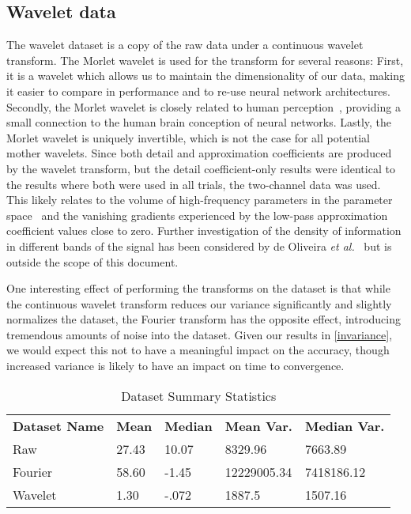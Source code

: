 \subsection{Wavelet data}
The wavelet dataset is a copy of the raw data under a continuous wavelet transform. 
The Morlet wavelet is used for the transform for several reasons:
First, it is a wavelet which allows us to maintain the dimensionality of our data, making it easier to compare in performance and to re-use neural network architectures.
Secondly, the Morlet wavelet is closely related to human perception~\cite{mallat1999wavelet, daugman1985uncertainty}, providing a small connection to the human brain conception of neural networks.
Lastly, the Morlet wavelet is uniquely invertible, which is not the case for all potential mother wavelets. 
Since both detail and approximation coefficients are produced by the wavelet transform, but the detail coefficient-only results were identical to the results where both were used in all trials, the two-channel data was used.
This likely relates to the volume of high-frequency parameters in the parameter space~\cite{rahaman2018spectral} and the vanishing gradients experienced by the low-pass approximation coefficient values close to zero.
Further investigation of the density of information in different bands of the signal has been considered by de Oliveira \textit{et al.}~\cite{de2006wavelet} but is outside the scope of this document.

One interesting effect of performing the transforms on the dataset is that while the continuous wavelet transform reduces our variance significantly and slightly normalizes the dataset, the Fourier transform has the opposite effect, introducing tremendous amounts of noise into the dataset.
Given our results in \ref{invariance}, we would expect this not to have a meaningful impact on the accuracy, though increased variance is likely to have an impact on time to convergence.

\renewcommand{\thefootnote}{*} 
\begin{table}[h]
\caption{Dataset Summary Statistics}
\centering
\label{Tab:summary}	
\begin{tabular}{l|llll}
\textbf{Dataset Name} & \textbf{Mean} & \textbf{Median} & \textbf{Mean Var.} & \textbf{Median Var.} \\\cline{1-5}
Raw         & 27.43    & 10.07    & 8329.96    & 7663.89 \\
Fourier       & 58.60\footnotemark    & -1.45    & 12229005.34    & 7418186.12 \\
Wavelet        & 1.30    & -.072    & 1887.5    & 1507.16 \\             
\end{tabular}
\end{table}

